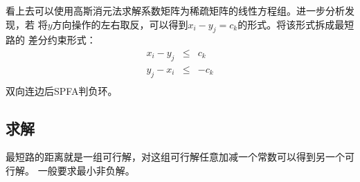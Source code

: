 看上去可以使用高斯消元法求解系数矩阵为稀疏矩阵的线性方程组。进一步分析发现，若
将$y$方向操作的左右取反，可以得到$x_i-y_j=c_k$的形式。将该形式拆成最短路的
差分约束形式：
\begin{eqnarray*}
    x_i-y_j&\leq& c_k\\
    y_j-x_i&\leq& -c_k\\
\end{eqnarray*}
双向连边后SPFA判负环。

\subsection{求解}
最短路的距离就是一组可行解，对这组可行解任意加减一个常数可以得到另一个可行解。
一般要求最小非负解。
